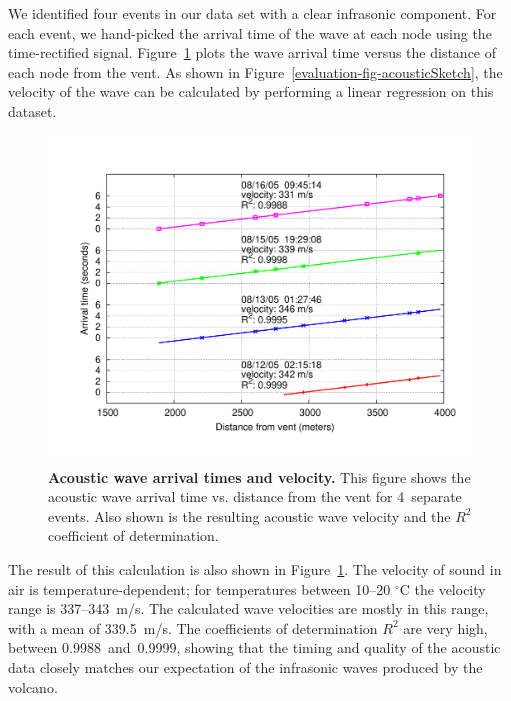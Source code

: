 We identified four events in our data set with a clear infrasonic component.
For each event, we hand-picked the arrival time of the wave at each node
using the time-rectified signal. Figure~\ref{evaluation-fig-acousticArrival}
plots the wave arrival time versus the distance of each node from the vent.
As shown in Figure~\ref{evaluation-fig-acousticSketch}, the velocity of the
wave can be calculated by performing a linear regression on this dataset.

\begin{figure}[t]
\begin{center}
\includegraphics[width=\hsize]{./3-evaluation/figs/fidelity/acousticArrival/acoustic.pdf}
\end{center}
\caption{\textbf{Acoustic wave arrival times and velocity.}
This figure shows the acoustic wave arrival time vs. distance from the vent
for 4~separate events. Also shown is the resulting acoustic wave velocity and
the $R^2$ coefficient of determination.}
\label{evaluation-fig-acousticArrival}
\end{figure}

The result of this calculation is also shown in
Figure~\ref{evaluation-fig-acousticArrival}. The velocity of sound in air is
temperature-dependent; for temperatures between 10--20 $^{\circ}$C the
velocity range is 337--343~m/s. The calculated wave velocities are mostly in
this range, with a mean of 339.5~m/s. The coefficients of determination $R^2$
are very high, between 0.9988~and~0.9999, showing that the timing and quality
of the acoustic data closely matches our expectation of the infrasonic waves
produced by the volcano.

